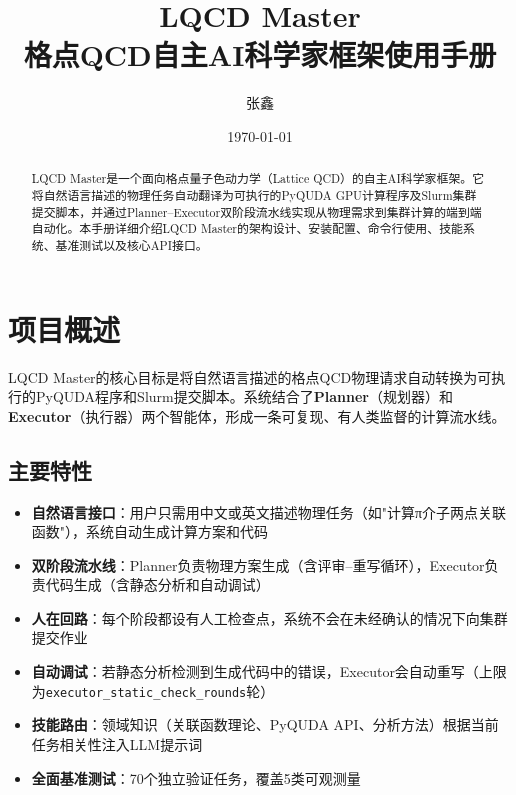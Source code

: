 \documentclass[12pt,a4paper]{ctexart}
\title{\heiti LQCD Master \\[3pt] \large 格点QCD自主AI科学家框架使用手册}
\author{张鑫}
\date{\today}
\begin{document}
\maketitle

\begin{abstract}
\noindent
LQCD Master是一个面向格点量子色动力学（Lattice QCD）的自主AI科学家框架。它将自然语言描述的物理任务自动翻译为可执行的PyQUDA GPU计算程序及Slurm集群提交脚本，并通过Planner--Executor双阶段流水线实现从物理需求到集群计算的端到端自动化。本手册详细介绍LQCD Master的架构设计、安装配置、命令行使用、技能系统、基准测试以及核心API接口。
\end{abstract}

\tableofcontents
\newpage

\section{项目概述}

LQCD Master的核心目标是将自然语言描述的格点QCD物理请求自动转换为可执行的PyQUDA程序和Slurm提交脚本。系统结合了\textbf{Planner}（规划器）和\textbf{Executor}（执行器）两个智能体，形成一条可复现、有人类监督的计算流水线。

\subsection{主要特性}
\begin{itemize}[leftmargin=*]
    \item \textbf{自然语言接口}：用户只需用中文或英文描述物理任务（如"计算π介子两点关联函数"），系统自动生成计算方案和代码
    \item \textbf{双阶段流水线}：Planner负责物理方案生成（含评审--重写循环），Executor负责代码生成（含静态分析和自动调试）
    \item \textbf{人在回路}：每个阶段都设有人工检查点，系统不会在未经确认的情况下向集群提交作业
    \item \textbf{自动调试}：若静态分析检测到生成代码中的错误，Executor会自动重写（上限为\texttt{executor\_static\_check\_rounds}轮）
    \item \textbf{技能路由}：领域知识（关联函数理论、PyQUDA API、分析方法）根据当前任务相关性注入LLM提示词
    \item \textbf{全面基准测试}：70个独立验证任务，覆盖5类可观测量
\end{itemize}
\end{document}
